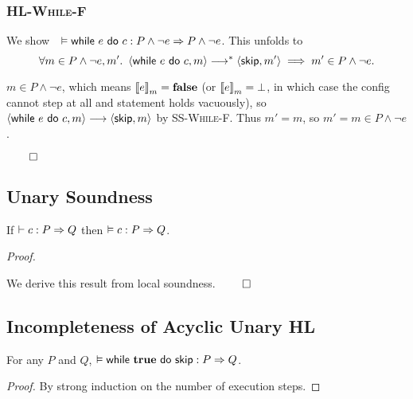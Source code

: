 \subsubsection*{\textsc{HL-While-F}}
We show~~$\VAL \Triple \While e do c : P \wedge \neg e => P \wedge \neg e$.
This unfolds to
$$\forall m \in P \wedge \neg e, m'.\
\Cfg(\While e do c,m) \sstepstotrans \Cfg(\Skip,m') \implies
m' \in P \wedge \neg e.$$

$m \in P \wedge \neg e$, which means $\Eval(e,m) = \False$
(or $\Eval(e,m) = \bot$, in which case the config cannot step at all and statement holds vacuously),
so $\Cfg(\While e do c,m) \sstepsto \Cfg(\Skip,m)$ by \textsc{SS-While-F}.
Thus $m' = m$, so $m' = m \in P \wedge \neg e$.


\hfill $\qed$

\subsection*{Unary Soundness}
\begin{theorem}
If $\DER \Triple c : P => Q$ then $\VAL \Triple c : P => Q$.
\end{theorem}

\noindent
\emph{Proof.}

\noindent
We derive this result from local soundness.
\hfill $\qed$


\subsection{Incompleteness of Acyclic Unary HL}

\begin{lemma}
    For any $P$ and $Q$,
    $\VAL \Triple {\While {\True} do {\Skip} } : P => Q$.
\end{lemma}
\begin{proof}
    By strong induction on the number of execution steps.
\end{proof}

